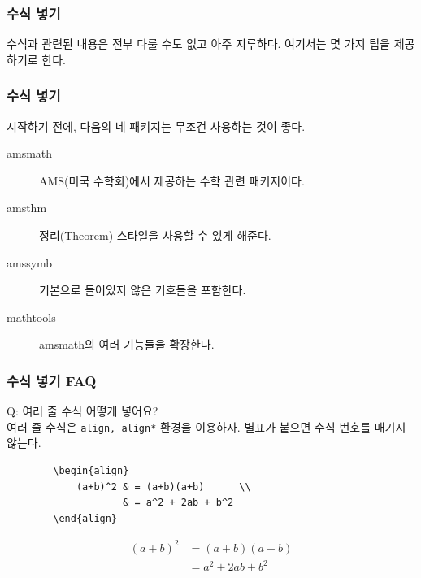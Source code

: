 \documentclass[aspectratio={169}]{beamer}
\begin{document}
\begin{frame}[fragile]
    \frametitle{수식 넣기}

    수식과 관련된 내용은 전부 다룰 수도 없고 아주 지루하다. 여기서는 몇 가지 팁을 제공하기로 한다.

\end{frame}

\begin{frame}[fragile]
    \frametitle{수식 넣기}

    시작하기 전에, 다음의 네 패키지는 무조건 사용하는 것이 좋다.

    \begin{description}
        \item[amsmath] AMS(미국 수학회)에서 제공하는 수학 관련 패키지이다.
        \item[amsthm] 정리(Theorem) 스타일을 사용할 수 있게 해준다.
        \item[amssymb] 기본으로 들어있지 않은 기호들을 포함한다.
        \item[mathtools] amsmath의 여러 기능들을 확장한다.
    \end{description}

\end{frame}


\begin{frame}[fragile]
    \frametitle{수식 넣기 FAQ}

    Q: 여러 줄 수식 어떻게 넣어요? \\

    여러 줄 수식은 \texttt{align, align*} 환경을 이용하자. 별표가 붙으면 수식 번호를 매기지 않는다.

    \begin{verbatim}
        \begin{align}
            (a+b)^2 & = (a+b)(a+b)      \\
                    & = a^2 + 2ab + b^2
        \end{align}
    \end{verbatim}
    \begin{align}
        (a+b)^2 & = (a+b)(a+b)      \\
                & = a^2 + 2ab + b^2
    \end{align}

\end{frame}
\end{document}
